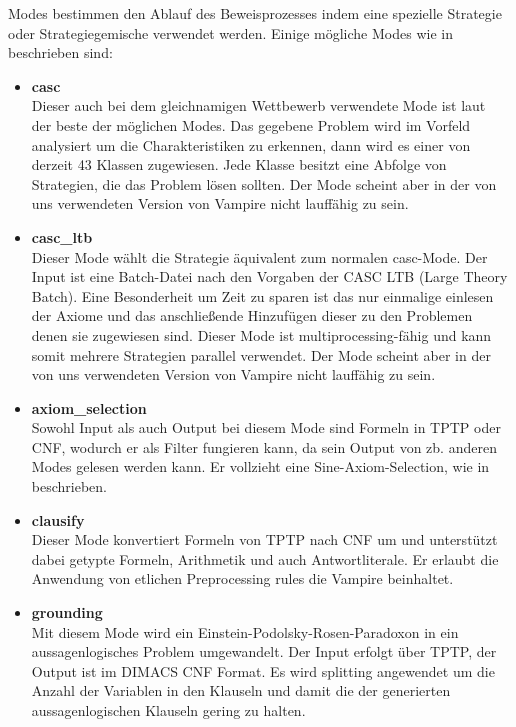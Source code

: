 \documentclass{acm_proc_article-sp-german}
\begin{document}
Modes bestimmen den Ablauf des Beweisprozesses indem eine spezielle Strategie oder Strategiegemische verwendet werden. 
Einige mögliche Modes wie in ~\cite{hoder2011slides} beschrieben sind:
\begin{itemize}
\item \textbf{casc} \\
		Dieser auch bei dem gleichnamigen Wettbewerb verwendete Mode ist laut ~\cite{hoder2011slides}  der beste der möglichen Modes.
		Das gegebene Problem wird im Vorfeld analysiert um die Charakteristiken zu erkennen, dann wird es einer von derzeit 43 Klassen zugewiesen. Jede Klasse besitzt eine Abfolge von Strategien, die das Problem lösen sollten.
		Der Mode scheint aber in der von uns verwendeten Version von Vampire nicht lauffähig zu sein.\\
\item \textbf{casc\_ltb} \\
		Dieser Mode wählt die Strategie äquivalent zum normalen casc-Mode. Der Input ist eine Batch-Datei nach den Vorgaben der CASC LTB (Large Theory Batch). Eine Besonderheit um Zeit zu sparen ist das nur einmalige einlesen der Axiome und das anschließende Hinzufügen dieser zu den Problemen denen sie zugewiesen sind. Dieser Mode ist multiprocessing-fähig und kann somit mehrere Strategien parallel verwendet.
		Der Mode scheint aber in der von uns verwendeten Version von Vampire nicht lauffähig zu sein.\\
\item\textbf{ axiom\_selection} \\
		Sowohl Input als auch Output bei diesem Mode sind Formeln in TPTP oder CNF, wodurch er als Filter fungieren kann, da sein Output von zb. anderen Modes gelesen werden kann.
		Er vollzieht eine Sine-Axiom-Selection, wie in ~\cite{sinquanon} beschrieben.\\
\item \textbf{clausify} \\
		Dieser Mode konvertiert Formeln von TPTP nach CNF um und unterstützt dabei getypte Formeln, Arithmetik und auch Antwortliterale. Er erlaubt die Anwendung von etlichen Preprocessing rules die Vampire beinhaltet. \\
\item \textbf{grounding} \\
		Mit diesem Mode wird ein Einstein-Podolsky-Rosen-Paradoxon in ein aussagenlogisches Problem umgewandelt. Der Input erfolgt über TPTP, der Output ist im DIMACS CNF Format.
		Es wird splitting angewendet um die Anzahl der Variablen in den Klauseln und damit die der generierten aussagenlogischen Klauseln gering zu halten. \\

\end{itemize}
\end{document}
